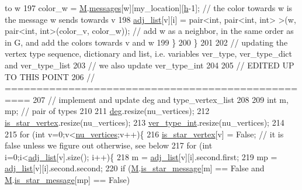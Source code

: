 \begin{DoxyCode}
{       to w}
197       color\_w = \hyperlink{classcolored__graph_ab72c568fe12f7c849ca6bffb145aec47}{M}.\hyperlink{classgraph__message_aac77e098f0acf9650116a8e51fe3b4b7}{messages}[w][my\_location][\hyperlink{classcolored__graph_ae27062a4ee59df2670d3a0c81e85a3fa}{h}-1]; \textcolor{comment}{// the color towards w is the message w sends
       towards v}
198       \hyperlink{classcolored__graph_a45dce16965079286cf3f41a54a1b2ea4}{adj\_list}[v][i] = pair<int, pair<int, int> >(w, pair<int, int>(color\_v, color\_w)); \textcolor{comment}{// add w as
       a neighbor, in the same order as in G, and add the colors towards v and w }
199     \}
200   \}
201 
202   \textcolor{comment}{// updating the vertex type sequence, dictionary and list, i.e. variables ver\_type, ver\_type\_dict and
       ver\_type\_list}
203   \textcolor{comment}{// we also update ver\_type\_int}
204 
205   \textcolor{comment}{// EDITED UP TO THIS POINT}
206   \textcolor{comment}{// ==================================================}
207   \textcolor{comment}{// implement and update deg and type\_vertex\_list}
208   
209   \textcolor{keywordtype}{int} m, mp; \textcolor{comment}{// pair of types}
210 
211   \hyperlink{classcolored__graph_ae3269d35c1b022bc70d195bebd4e1b8a}{deg}.resize(nu\_vertices);
212   \hyperlink{classcolored__graph_ad41163e970530c7e45878d299f0dc961}{is\_star\_vertex}.resize(nu\_vertices);
213   \hyperlink{classcolored__graph_a491ed2ea1a65118af02ec606c8d44c0a}{ver\_type\_int}.resize(nu\_vertices);
214 
215   \textcolor{keywordflow}{for} (\textcolor{keywordtype}{int} v=0;v<\hyperlink{classcolored__graph_a90ece8eb1fec52f3f41549ab527c1d5b}{nu\_vertices};v++)\{
216     \hyperlink{classcolored__graph_ad41163e970530c7e45878d299f0dc961}{is\_star\_vertex}[v] = False; \textcolor{comment}{// it is false unless we figure out otherwise, see below}
217     \textcolor{keywordflow}{for} (\textcolor{keywordtype}{int} i=0;i<\hyperlink{classcolored__graph_a45dce16965079286cf3f41a54a1b2ea4}{adj\_list}[v].size(); i++)\{
218       m = \hyperlink{classcolored__graph_a45dce16965079286cf3f41a54a1b2ea4}{adj\_list}[v][i].second.first;
219       mp = \hyperlink{classcolored__graph_a45dce16965079286cf3f41a54a1b2ea4}{adj\_list}[v][i].second.second;
220       \textcolor{keywordflow}{if} (\hyperlink{classcolored__graph_ab72c568fe12f7c849ca6bffb145aec47}{M}.\hyperlink{classgraph__message_a55ff5531a0043106369e84a7bc45e22d}{is\_star\_message}[m] == False and \hyperlink{classcolored__graph_ab72c568fe12f7c849ca6bffb145aec47}{M}.\hyperlink{classgraph__message_a55ff5531a0043106369e84a7bc45e22d}{is\_star\_message}[mp] == False)

\end{DoxyCode}
